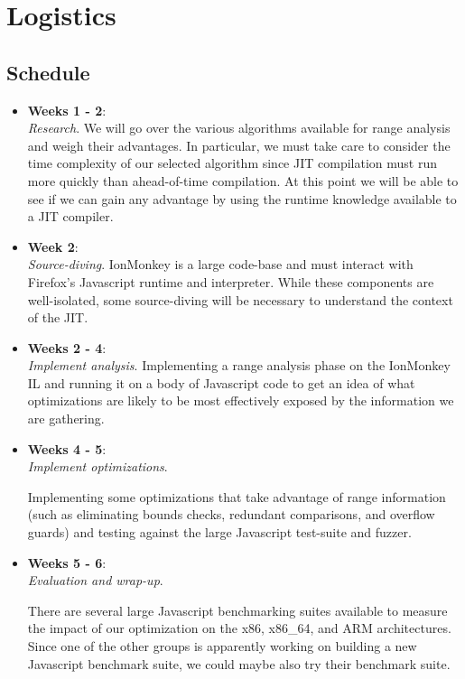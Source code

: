 \documentclass{article}
\begin{document}
\section{Logistics}
\subsection{Schedule}
\begin{itemize}
\item \textbf{Weeks 1 - 2}:\\
\textit{Research}.
We will go over the various algorithms available for range analysis
and weigh their advantages. In particular, we must take care to
consider the time complexity of our selected algorithm since JIT
compilation must run more quickly than ahead-of-time compilation. At
this point we will be able to see if we can gain any advantage by
using the runtime knowledge available to a JIT compiler.
\item \textbf{Week 2}:\\
\textit{Source-diving}.
IonMonkey is a large code-base and must interact with Firefox's
Javascript runtime and interpreter. While these components are
well-isolated, some source-diving will be necessary to understand the
context of the JIT.

\item \textbf{Weeks 2 - 4}:\\
\textit{Implement analysis}.
Implementing a range analysis phase on the IonMonkey IL and running it
on a body of Javascript code to get an idea of what optimizations are
likely to be most effectively exposed by the information we are
gathering.

\item \textbf{Weeks 4 - 5}:\\
\textit{Implement optimizations}.

Implementing some optimizations that take advantage of range information (such
as eliminating bounds checks, redundant comparisons, and overflow guards)
and testing against the large Javascript test-suite and fuzzer.

\item \textbf{Weeks 5 - 6}:\\
\textit{Evaluation and wrap-up}.

There are several large Javascript benchmarking suites available to
measure the impact of our optimization on the x86, x86\_64, and ARM
architectures. Since one of the other groups is apparently working on
building a new Javascript benchmark suite, we could maybe also try
their benchmark suite.

\end{itemize}
\end{document}

